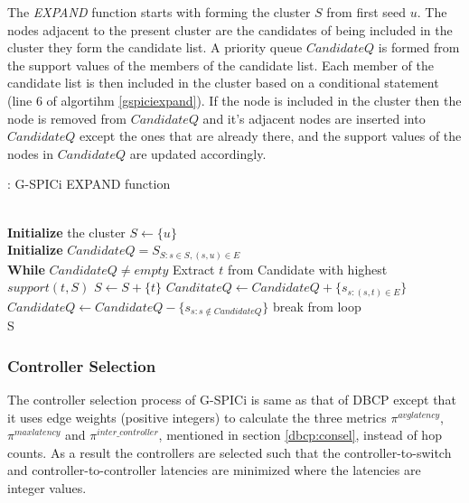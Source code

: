 \documentclass[a4paper,twocolumn,preprint]{elsarticle}
\begin{document}
The \emph{EXPAND} function starts with forming the cluster $S$ from first seed $u$. The nodes adjacent to the present cluster are the candidates of being included in the cluster they form the candidate list. A priority queue $CandidateQ$ is formed from the support values of the members of the candidate list. Each member of the candidate list is then included in the cluster based on a conditional statement (line 6 of algortihm \ref{gspiciexpand}). If the node is included in the cluster then the node is removed from $CandidateQ$ and it's adjacent nodes are inserted into $CandidateQ$ except the ones that are already there, and the support values of the nodes in $CandidateQ$ are updated accordingly.

\begin{algorithm}
	\caption{: G-SPICi EXPAND function}\label{gspiciexpand}
	\begin{algorithmic}[1]
		\\
		\textbf{Initialize} the cluster $S \gets \{u\}$ \\
		\textbf{Initialize} $CandidateQ = S_{S:s\in S,(s,u)\in E}$\\
		\textbf{While} $CandidateQ \neq empty$
		\State Extract $t$ from Candidate with highest $support(t,S)$
		\State $S\gets S+\{t\}$
		\State $CanditateQ \gets CandidateQ + \{s_{s:(s,t)\in E}\}$
		\State $CandidateQ \gets CandidateQ - \{s_{s:s\not\in CandidateQ}\}$
		\Else
		\State break from loop
		\EndIf \\
		\Return S
		\EndProcedure
	\end{algorithmic}
\end{algorithm}
\subsubsection{Controller Selection}
The controller selection process of G-SPICi is same as that of DBCP except that it uses edge weights (positive integers) to calculate the three metrics $\pi^{avglatency}$, $\pi^{maxlatency}$ and $\pi^{inter\_controller}$, mentioned in section \ref{dbcp:consel}, instead of hop counts. As a result the controllers are selected such that the controller-to-switch and controller-to-controller latencies are minimized where the latencies are integer values.
\end{document}
